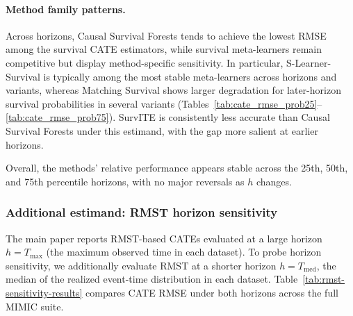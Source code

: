 \documentclass{article} %
\begin{document}
\paragraph{Method family patterns.}
Across horizons, Causal Survival Forests tends to achieve the lowest RMSE among the survival CATE estimators, while survival meta-learners remain competitive but display method-specific sensitivity. In particular, S-Learner-Survival is typically among the most stable meta-learners across horizons and variants, whereas Matching Survival shows larger degradation for later-horizon survival probabilities in several variants (Tables~\ref{tab:cate_rmse_prob25}--\ref{tab:cate_rmse_prob75}). SurvITE is consistently less accurate than Causal Survival Forests under this estimand, with the gap more salient at earlier horizons.

Overall, the methods' relative performance appears stable across the 25th, 50th, and 75th percentile horizons, with no major reversals as $h$ changes.


\subsubsection{Additional estimand: RMST horizon sensitivity}
\label{apd:rmst_horizon_sensitivity}

The main paper reports RMST-based CATEs evaluated at a large horizon $h=T_{\max}$ (the maximum observed time in each dataset). To probe horizon sensitivity, we additionally evaluate RMST at a shorter horizon $h=T_{\text{med}}$, the median of the realized event-time distribution in each dataset. Table~\ref{tab:rmst-sensitivity-results} compares CATE RMSE under both horizons across the full MIMIC suite.




\end{document}
